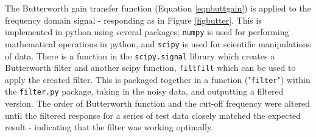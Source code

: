 \documentclass[twoside,a4]{report}
\def\br{\newline \newline \noindent}
\begin{document}
	
	\noindent
	The Butterworth gain transfer function (Equation \ref{eqnbuttgain}) is applied to the frequency domain signal - responding as in Figure \ref{figbutter}.
	This is implemented in python using several packages; \texttt{numpy} \cite{numpyref} is used for performing mathematical operations in python, and \texttt{scipy} \cite{scipyref} is used for scientific manipulations of data. \br
	There is a function in the \texttt{scipy.signal} library which creates a Butterworth filter and another scipy function, \texttt{filtfilt} which can be used to apply the created filter. This is packaged together in a function ("\texttt{filter}") within the \texttt{filter.py} package, taking in the noisy data, and outputting a filtered version. The order of Butterworth function and the cut-off frequency were altered until the filtered response for a series of test data closely matched the expected result - indicating that the filter was working optimally.
	
\end{document}
